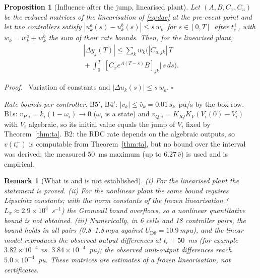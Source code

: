 \documentclass[11pt,twocolumn]{article}
\newtheorem{proposition}{Proposition}
\newtheorem{remark}{Remark}
\newenvironment{proof}{\par\noindent\textit{Proof.}\ }{\hfill$\square$\par}
\newcommand{\UD}{U_{\mathrm{D8}}}
\begin{document}
\begin{proposition}[Influence after the jump, linearised plant]
\label{prop:os}
Let $(A,B,C_x,C_u)$ be the reduced matrices of the linearisation of \eqref{eq:dae} at the pre-event point and let two controllers satisfy $|u_k^a(s)-u_k^b(s)|\le s\,w_k$\ for $s\in[0,T]$\ after $t_e^+$, with $w_k=w^a_k+w^b_k$ the sum of their rate bounds. Then, for the linearised plant,
\begin{multline}
|\Delta y_j(T)|\le\sum_k w_k\Big(|C_{u,jk}|\,T\\
{}+\int_0^T\big|[C_xe^{A(T-s)}B]_{jk}\big|\,s\,ds\Big).
\end{multline}
\end{proposition}
\begin{proof}
Variation of constants and $|\Delta u_k(s)|\le s\,w_k$.
\end{proof}
\emph{Rate bounds per controller.} B5$'$, B4$'$: $|v_k|\le\bar v_k=0.01\,s_k$~pu/s by the box row. B1s: $v_{P,i}=k_i(1-\omega_i)\to0$ ($\omega_i$ is a state) and $v_{Q,i}=K_{IQ}K_V(V_i(0)-V_i)$ with $V_i$ algebraic, so its initial value equals the jump of $V_i$ fixed by Theorem~\ref{thm:ta}. B2: the RDC rate depends on the algebraic outputs, so $v(t_e^+)$ is computable from Theorem~\ref{thm:ta}, but no bound over the interval was derived; the measured $50$~ms maximum (up to $6.27\,\bar v$) is used and is empirical.

\begin{remark}[What is and is not established]
(i) For the linearised plant the statement is proved. (ii) For the nonlinear plant the same bound requires Lipschitz constants; with the norm constants of the frozen linearisation ($L_x\approx2.9\times10^4$~s$^{-1}$) the Gronwall bound overflows, so \emph{a nonlinear quantitative bound is not obtained}. (iii) Numerically, in 6 cells and 18 controller pairs, the bound holds in all pairs (0.8--1.8\,mpu against $\UD=10.9$\,mpu), and the linear model reproduces the observed output differences at $t_e+50$~ms (for example $3.82\times10^{-4}$ vs. $3.84\times10^{-4}$~pu); the observed unit-output differences reach $5.0\times10^{-4}$~pu. These matrices are estimates of a frozen linearisation, not certificates.
\end{remark}
\end{document}
